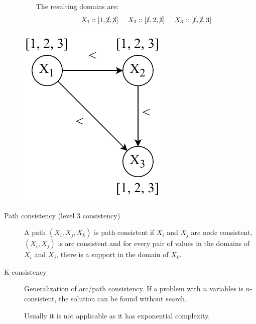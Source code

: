 \begin{description}
\begin{example}
\begin{minipage}{0.7\textwidth}
\begin{enumerate}
                        The resulting domains are:
                        \[ X_1 :: [1, \cancel{2}, \cancel{3}] \hspace{0.5cm} X_2 :: [\cancel{1}, 2, \cancel{3}] \hspace{0.5cm} X_3 :: [\cancel{1}, \cancel{2}, 3] \]
                \end{enumerate}
            \end{minipage}
            \begin{minipage}{0.20\textwidth}
                \includegraphics[width=\linewidth]{img/_constraint_graph.pdf}
            \end{minipage}
        \end{example}

    \item[Path consistency (level 3 consistency)] 
        A path $(X_i, X_j, X_k)$ is path consistent if $X_i$ and $X_j$ are node consistent, $(X_i, X_j)$ is arc consistent and
        for every pair of values in the domains of $X_i$ and $X_j$, there is a support in the domain of $X_k$.

    \item[K-consistency] 
        Generalization of arc/path consistency.
        If a problem with $n$ variables is $n$-consistent, the solution can be found without search.

        Usually it is not applicable as it has exponential complexity.
\end{description}